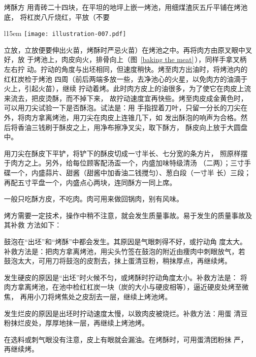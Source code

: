 \begin{recipe}{烤酥方}
\step[烤酥] 用青砖二十四块，在平坦的地坪上嵌一烤池，用细煤渣灰五斤平铺在烤池底，
将杠炭八斤烧红，平放（不要
\begin{wrapfigure}[13]{l}{15em}%
\centering%
\vspace{-.5\baselineskip}%
\texttt{[image: illustration-007.pdf]}%
\vspace{.1875\baselineskip}%
\caption{烤酥}
\label{baking the meat}
\end{wrapfigure}
%
立放，立放便要伸出火苗，烤酥时严忌火苗）在烤池之中。再将肉方由原叉眼中叉好，放
于烤池上，肉皮向火，排骨向上（图~\ref{baking the meat}\,），同样手拿叉柄左右拧
动。拧动的角度与出坯相同，但速度稍快。烤至肉方出油时，将烤池内的红杠炭检于烤池
四周（前后两端多放一些，去净池心的火星，以免肉方的油滴于火上，引起火苗），继续
拧动着烤。此时肉方皮上的油很多，为了使它在肉皮上流来流去，把皮烫酥，而不掉下来，
故拧动速度宜再快些。烤至肉皮成金黄色时，可以用刀尖试验一下是否酥泡。试法是：用
手指捏着刀叶，只留一分长的刀尖在外，将肉方拿离烤池，用刀尖在肉皮上连锥几下，如
发出酥泡的响声为合格。然后将香油三钱刷于酥皮之上，用净布擦净叉尖，取下酥方，
酥皮向上放于大圆盘中。

\step[铲皮上席] 用刀尖在酥皮下平铲，将铲下的酥皮切成一寸半长、七分宽的条方片，
照原样摆于肉方之上。另外，给每位顾客配汤盃一个，内盛加味特级清汤\footnotemark
（二两）；三寸手碟一个，内盛蒜片、甜酱（甜酱中加香油二钱搅匀）、葱白段（一寸半
长）三段；再配五寸平盘一个，内盛点心两块，连同酥方一同上席。

\step[吃法] 一般只吃酥方皮，不吃肉。肉可用来做回锅肉，别有风味。

\suggestion

烤方需要一定技术，操作中稍不注意，就会发生质量事故。易于发生的质量事故及其补救
方法如下：

\hint[方皮鼓泡] 鼓泡在“出坯”和“烤酥”中都会发生。其原因是气眼刺得不好，或拧动角
度太大。补救方法是：把肉方拿离烤池，用尖头竹签在鼓泡的附近由痩肉中刺眼放气，若
鼓泡太大，可用刀将鼓泡的皮割去，抹上蛋清豆粉，稍抹厚点，再继续烤。

\hint[硬皮] 发生硬皮的原因是“出坯”时火候不匀，或烤酥时拧动角度太小。补救方法是：
将肉方拿离烤池，在池中检红杠炭一块（炭的大小与硬皮相等），逼近硬皮处烤至微焦，
再用小刀将烤焦处之皮刮去一层，继续上烤池烤。

\hint[烂皮] 发生烂皮的原因是出坯时拧动速度太慢，以致肉皮被烧烂。补救方法：用蛋
清豆粉抹烂皮处，厚厚地抹一层，再继续上烤池烤。

\hint[漏油] 在选料或刺气眼没有注意，皮上有眼就会漏油。在烤酥时，可用蛋清团粉抹
严，再继续烤。


\end{recipe}
